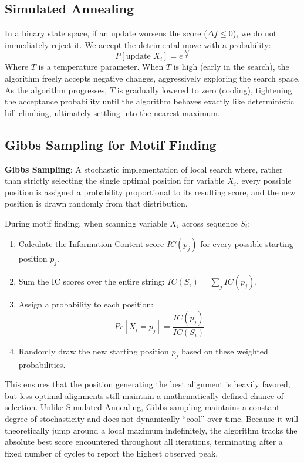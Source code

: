 \subsection{Simulated Annealing}
In a binary state space, if an update worsens the score ($\Delta f \le 0$), we do not immediately reject it. We accept the detrimental move with a probability:
\[
  P[\text{update } X_i] = e^{\frac{\Delta f}{T}}
\]
Where $T$ is a temperature parameter. 
When $T$ is high (early in the search), the algorithm freely accepts negative changes, aggressively exploring the search space. As the algorithm progresses, $T$ is gradually lowered to zero (cooling), tightening the acceptance probability until the algorithm behaves exactly like deterministic hill-climbing, ultimately settling into the nearest maximum.

\subsection{Gibbs Sampling for Motif Finding}

\begin{important}
  \textbf{Gibbs Sampling}: A stochastic implementation of local search where, rather than strictly selecting the single optimal position for variable $X_i$, every possible position is assigned a probability proportional to its resulting score, and the new position is drawn randomly from that distribution.
\end{important}

During motif finding, when scanning variable $X_i$ across sequence $S_i$:
\begin{enumerate}
  \item Calculate the Information Content score $IC(p_j)$ for every possible starting position $p_j$.
  \item Sum the IC scores over the entire string: $IC(S_i) = \sum_{j} IC(p_j)$.
  \item Assign a probability to each position:
  \[
    Pr[X_i = p_j] = \frac{IC(p_j)}{IC(S_i)}
  \]
  \item Randomly draw the new starting position $p_j$ based on these weighted probabilities.
\end{enumerate}

This ensures that the position generating the best alignment is heavily favored, but less optimal alignments still maintain a mathematically defined chance of selection. Unlike Simulated Annealing, Gibbs sampling maintains a constant degree of stochasticity and does not dynamically ``cool'' over time. Because it will theoretically jump around a local maximum indefinitely, the algorithm tracks the absolute best score encountered throughout all iterations, terminating after a fixed number of cycles to report the highest observed peak.

